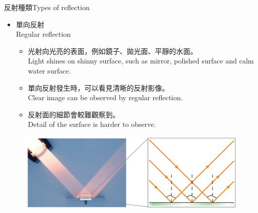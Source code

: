 \documentclass[beamer=true]{standalone}
\begin{document}
\begin{frame}{反射種類Types of reflection}
    \begin{itemize}
        \item 單向反射\\Regular reflection
        \begin{itemize}
            \item 光射向光亮的表面，例如鏡子、拋光面、平靜的水面。\\Light shines on shinny surface, such as mirror, polished surface and calm water surface.
            \item 單向反射發生時，可以看見清晰的反射影像。\\Clear image can be observed by regular reflection.
            \item 反射面的細節會較難觀察到。\\Detail of the surface is harder to observe.
        \end{itemize}
    \end{itemize}
    \begin{figure}
        \centering
        \includegraphics[width=0.75\linewidth]{assets/qdjdoiqwjoidjqwoidjqwiodjwioqjdoiqwjd.png}
    \end{figure}
\end{frame}
\end{document}
